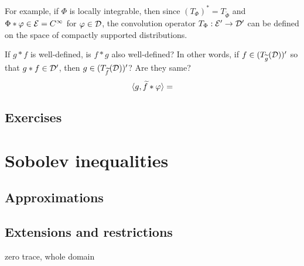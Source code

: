 \documentclass{../../large}
\begin{document}
For example, if $\Phi$ is locally integrable, then since $(T_\Phi)^*=T_{\tilde\Phi}$ and $\Phi*\varphi\in\mathcal{E}=C^\infty$ for $\varphi\in\mathcal{D}$, the convolution operator $T_\Phi:\mathcal{E}'\to\mathcal{D}'$ can be defined on the space of compactly supported distributions.

If $g*f$ is well-defined, is $f*g$ also well-defined?
In other words, if $f\in(T_{\widetilde g}(\mathcal{D}))'$ so that $g*f\in\mathcal{D}'$, then $g\in(T_{\widetilde f}(\mathcal{D}))'$? Are they same?
\[\langle g,\widetilde f*\varphi\rangle=\]



\section*{Exercises}








\chapter{Sobolev inequalities}

\section{Approximations}
\begin{prb}
\end{prb}
\begin{prb}
\end{prb}
\begin{prb}
\end{prb}
\begin{prb}
\end{prb}

\section{Extensions and restrictions}
\begin{prb}
\end{prb}
\begin{prb}
\end{prb}
\begin{prb}
\end{prb}
\begin{prb}
zero trace, whole domain
\end{prb}
\end{document}
